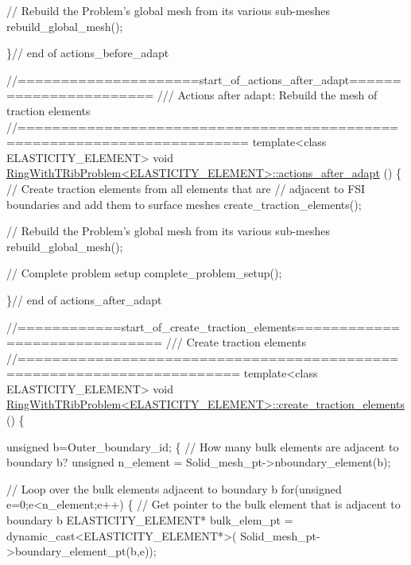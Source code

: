 \begin{DoxyCodeInclude}
 \textcolor{comment}{// Rebuild the Problem's global mesh from its various sub-meshes}
 rebuild\_global\_mesh();

\}\textcolor{comment}{// end of actions\_before\_adapt}



\textcolor{comment}{//=====================start\_of\_actions\_after\_adapt=======================}\textcolor{comment}{}
\textcolor{comment}{///  Actions after adapt: Rebuild the mesh of traction elements}
\textcolor{comment}{}\textcolor{comment}{//========================================================================}
\textcolor{keyword}{template}<\textcolor{keyword}{class} ELASTICITY\_ELEMENT>
\textcolor{keywordtype}{void} \hyperlink{classRingWithTRibProblem_a8749aaf1e46d802c210b51e07093505b}{RingWithTRibProblem<ELASTICITY\_ELEMENT>::actions\_after\_adapt}
      ()
\{
 \textcolor{comment}{// Create traction elements from all elements that are }
 \textcolor{comment}{// adjacent to FSI boundaries and add them to surface meshes}
 create\_traction\_elements();
 
 \textcolor{comment}{// Rebuild the Problem's global mesh from its various sub-meshes}
 rebuild\_global\_mesh();
 
 \textcolor{comment}{// Complete problem setup}
 complete\_problem\_setup();   
 
\}\textcolor{comment}{// end of actions\_after\_adapt}


\textcolor{comment}{//============start\_of\_create\_traction\_elements==============================}\textcolor{comment}{}
\textcolor{comment}{/// Create traction elements }
\textcolor{comment}{}\textcolor{comment}{//=======================================================================}
\textcolor{keyword}{template}<\textcolor{keyword}{class} ELASTICITY\_ELEMENT>
\textcolor{keywordtype}{void} \hyperlink{classRingWithTRibProblem_ac4445c7a9fbfdcb69063d36fe0fe08c3}{RingWithTRibProblem<ELASTICITY\_ELEMENT>::create\_traction\_elements}
      ()
\{

 \textcolor{keywordtype}{unsigned} b=Outer\_boundary\_id;
 \{
  \textcolor{comment}{// How many bulk elements are adjacent to boundary b?}
  \textcolor{keywordtype}{unsigned} n\_element = Solid\_mesh\_pt->nboundary\_element(b);
   
  \textcolor{comment}{// Loop over the bulk elements adjacent to boundary b}
  \textcolor{keywordflow}{for}(\textcolor{keywordtype}{unsigned} e=0;e<n\_element;e++)
   \{
    \textcolor{comment}{// Get pointer to the bulk element that is adjacent to boundary b}
    ELASTICITY\_ELEMENT* bulk\_elem\_pt = \textcolor{keyword}{dynamic\_cast<}ELASTICITY\_ELEMENT*\textcolor{keyword}{>}(
     Solid\_mesh\_pt->boundary\_element\_pt(b,e));
    

\end{DoxyCodeInclude}
